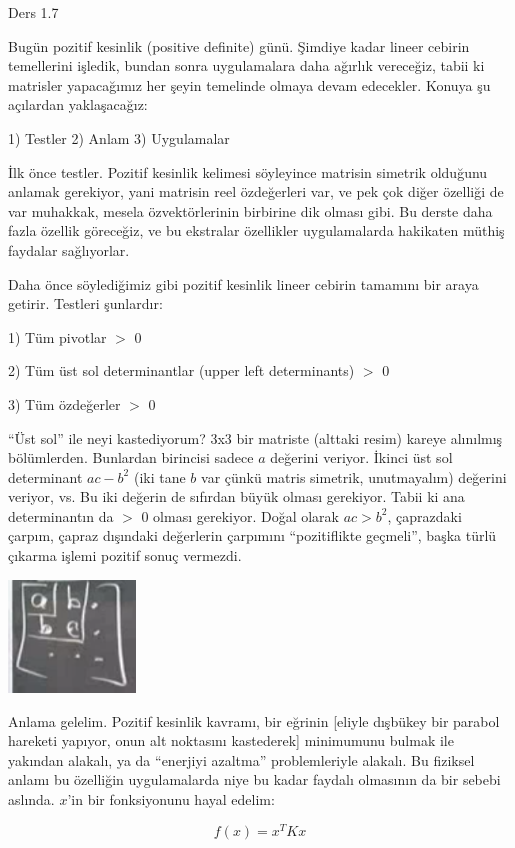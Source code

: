 \documentclass[12pt,fleqn]{article}\usepackage{../../common}
\begin{document}
Ders 1.7

Bugün pozitif kesinlik (positive definite) günü. Şimdiye kadar lineer
cebirin temellerini işledik, bundan sonra uygulamalara daha ağırlık
vereceğiz, tabii ki matrisler yapacağımız her şeyin temelinde olmaya devam
edecekler. Konuya şu açılardan yaklaşacağız:

1) Testler 2) Anlam 3) Uygulamalar

İlk önce testler. Pozitif kesinlik kelimesi söyleyince matrisin simetrik
olduğunu anlamak gerekiyor, yani matrisin reel özdeğerleri var, ve pek çok
diğer özelliği de var muhakkak, mesela özvektörlerinin birbirine dik olması
gibi. Bu derste daha fazla özellik göreceğiz, ve bu ekstralar özellikler
uygulamalarda hakikaten müthiş faydalar sağlıyorlar.

Daha önce söylediğimiz gibi pozitif kesinlik lineer cebirin tamamını bir
araya getirir. Testleri şunlardır:

1) Tüm pivotlar $>$ 0 

2) Tüm üst sol determinantlar (upper left determinants)  $>$ 0

3) Tüm özdeğerler $>$ 0

``Üst sol'' ile neyi kastediyorum? 3x3 bir matriste (alttaki resim) kareye
alınılmış bölümlerden. Bunlardan birincisi sadece $a$ değerini
veriyor. İkinci üst sol determinant $ac - b^2$ (iki tane $b$ var çünkü
matris simetrik, unutmayalım) değerini veriyor, vs. Bu iki değerin de
sıfırdan büyük olması gerekiyor. Tabii ki ana determinantın da $>$ 0 olması
gerekiyor. Doğal olarak $ac > b^2$, çaprazdaki çarpım, çapraz dışındaki
değerlerin çarpımını ``pozitiflikte geçmeli'', başka türlü çıkarma işlemi
pozitif sonuç vermezdi.

\includegraphics[height=3cm]{7_1.png}

Anlama gelelim. Pozitif kesinlik kavramı, bir eğrinin [eliyle dışbükey bir
parabol hareketi yapıyor, onun alt noktasını kastederek] minimumunu bulmak
ile yakından alakalı, ya da ``enerjiyi azaltma'' problemleriyle alakalı. Bu
fiziksel anlamı bu özelliğin uygulamalarda niye bu kadar faydalı olmasının
da bir sebebi aslında. $x$'in bir fonksiyonunu hayal edelim:

$$ f(x) = x^TKx $$
\end{document}
